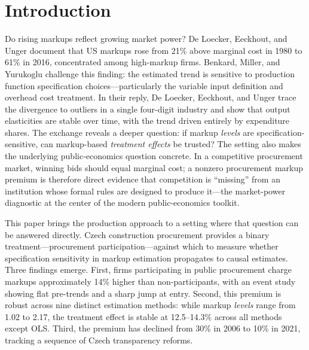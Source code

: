 \documentclass[11pt]{article}
\begin{document}
\newpage
\tableofcontents
\newpage

\section{Introduction}\label{sec:intro}

Do rising markups reflect growing market power? De Loecker, Eeckhout, and Unger \cite{DLEU2020} document that US markups rose from 21\% above marginal cost in 1980 to 61\% in 2016, concentrated among high-markup firms. Benkard, Miller, and Yurukoglu \cite{BMY2026} challenge this finding: the estimated trend is sensitive to production function specification choices---particularly the variable input definition and overhead cost treatment. In their reply, De Loecker, Eeckhout, and Unger \cite{DLEU2025reply} trace the divergence to outliers in a single four-digit industry and show that output elasticities are stable over time, with the trend driven entirely by expenditure shares. The exchange reveals a deeper question: if markup \emph{levels} are specification-sensitive, can markup-based \emph{treatment effects} be trusted? The setting also makes the underlying public-economics question concrete. In a competitive procurement market, winning bids should equal marginal cost; a nonzero procurement markup premium is therefore direct evidence that competition is ``missing'' from an institution whose formal rules are designed to produce it---the market-power diagnostic at the center of the modern public-economics toolkit.

This paper brings the production approach to a setting where that question can be answered directly. Czech construction procurement provides a binary treatment---procurement participation---against which to measure whether specification sensitivity in markup estimation propagates to causal estimates. Three findings emerge. First, firms participating in public procurement charge markups approximately 14\% higher than non-participants, with an event study showing flat pre-trends and a sharp jump at entry. Second, this premium is robust across nine distinct estimation methods: while markup \emph{levels} range from 1.02 to 2.17, the treatment effect is stable at 12.5--14.3\% across all methods except OLS. Third, the premium has declined from 30\% in 2006 to 10\% in 2021, tracking a sequence of Czech transparency reforms.
\end{document}

